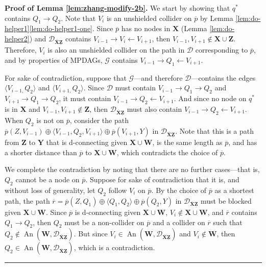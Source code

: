 \documentclass[11pt]{article}
\DeclareMathOperator{\An}{An}
\newcommand{\BlackBox}{\rule{1.5ex}{1.5ex}}  %
\newcommand{\mb}[1]{\mathbf{#1}}
\newcommand{\g}[1][G]{\mathcal{#1}}
\newenvironment{proofof}[1][]{\noindent \textbf{Proof of #1.}}{\hfill\BlackBox}
\begin{document}
\begin{proofof}[Lemma \ref{lem:zhang-modify-2b}]
    We start by showing that $q^*$ contains $Q_1 \to Q_2$. Note that $V_i$ is an unshielded collider on $\overline{p}$ by Lemma \ref{lem:do-helper1}\ref{lem:do-helper1-one}. Since $\overline{p}$ has no nodes in $\mb{X}$ (Lemma \ref{lem:do-helper2}) and $\g[D]_{\overline{\mb{X}}\underline{\mb{Z}}}$ contains $V_{i-1} \to V_i \gets V_{i+1}$, then $V_{i-1}, V_{i+1} \notin \mb{X} \cup \mb{Z}$. Therefore, $V_i$ is also an unshielded collider on the path in $\g[D]$ corresponding to $\overline{p}$, and by properties of MPDAGs, $\g$ contains $V_{i-1} \to Q_1 \gets V_{i+1}$. 
    
    For sake of contradiction, suppose that $\g$---and therefore $\g[D]$---contains the edges $\langle V_{i-1,} Q_2 \rangle$ and $\langle V_{i+1,} Q_2 \rangle$. Since $\g[D]$ must contain $V_{i-1} \to Q_1 \to Q_2$ and $V_{i+1} \to Q_1 \to Q_2$, it must contain $V_{i-1} \to Q_2 \gets V_{i+1}$. And since no node on $q^*$ is in $\mb{X}$ and $V_{i-1}, V_{i+1} \notin \mb{Z}$, then $\g[D]_{\overline{\mb{X}}\underline{\mb{Z}}}$ must also contain $V_{i-1} \to Q_2 \gets V_{i+1}$. When $Q_2$ is not on $\overline{p}$, consider the path $\overline{p}(Z, V_{i-1}) \oplus \langle V_{i-1}, Q_2, V_{i+1} \rangle \oplus \overline{p}(V_{i+1}, Y)$ in $\g[D]_{\overline{\mb{X}}\underline{\mb{Z}}}$. Note that this is a path from $\mb{Z}$ to $\mb{Y}$ that is d-connecting given $\mb{X} \cup \mb{W}$, is the same length as $\overline{p}$, and has a shorter distance than $\overline{p}$ to $\mb{X} \cup \mb{W}$, which contradicts the choice of $\overline{p}$.
    
    We complete the contradiction by noting that there are no further cases---that is, $Q_2$ cannot be a node on $\overline{p}$. Suppose for sake of contradiction that it is, and without loss of generality, let $Q_2$ follow $V_i$ on $\overline{p}$. By the choice of $\overline{p}$ as a shortest path, the path $\overline{r} = \overline{p}(Z, Q_1) \oplus \langle Q_1, Q_2 \rangle \oplus \overline{p}(Q_2, Y)$ in $\g[D]_{\overline{\mb{X}}\underline{\mb{Z}}}$ must be blocked given $\mb{X} \cup \mb{W}$. Since $\overline{p}$ is d-connecting given $\mb{X} \cup \mb{W}$, $V_i \notin \mb{X} \cup \mb{W}$, and $\overline{r}$ contains $Q_1 \to Q_2$, then $Q_2$ must be a non-collider on $\overline{p}$ and a collider on $\overline{r}$ such that $Q_2 \notin \An(\mb{W}, \g[D]_{\overline{\mb{X}}\underline{\mb{Z}}})$. But since $V_i \in \An(\mb{W}, \g[D]_{\overline{\mb{X}}\underline{\mb{Z}}})$ and $V_i \notin \mb{W}$, then $Q_2 \in \An(\mb{W}, \g[D]_{\overline{\mb{X}}\underline{\mb{Z}}})$, which is a contradiction.
    

\end{proofof}
\end{document}
